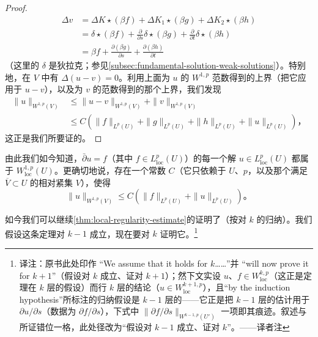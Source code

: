 \begin{proof}
\[
\begin{aligned}
\Delta v&=\Delta K\star(\beta f)+\Delta K_{1}\star(\beta g)+\Delta K_{2}\star(\beta h)\\
&=\delta\star(\beta f)+\frac{\partial}{\partial s}\delta\star(\beta g)+\frac{\partial}{\partial t}\delta\star(\beta h)\\
&=\beta f+\frac{\partial(\beta g)}{\partial s}+\frac{\partial(\beta h)}{\partial t}
\end{aligned}
\]
（这里的 $\delta$ 是狄拉克\trDistribution；参见\cref{subsec:fundamental-solution-weak-solutions}）。特别地，在 $V$ 中有 $\Delta(u-v)=0$。利用上面为 $u$ 的 $W^{1,p}$ 范数得到的上界（把它应用于 $u-v$），以及为 $v$ 的范数得到的那个上界，我们发现
\[
\begin{aligned}
\|u\|_{W^{1,p}(V)}&\le\|u-v\|_{W^{1,p}(V)}+\|v\|_{W^{1,p}(V)}\\
&\le C\left(\|f\|_{L^{p}(U)}+\|g\|_{L^{p}(U)}+\|h\|_{L^{p}(U)}+\|u\|_{L^{p}(U)}\right)\text{，}
\end{aligned}
\]
这正是我们所要证的。
\end{proof}

由此我们如今知道，$\bar{\partial}u=f$（其中 $f\in L^{p}_{\mathrm{loc}}(U)$）的每一个解 $u\in L^{p}_{\mathrm{loc}}(U)$ 都属于 $W^{1,p}_{\mathrm{loc}}(U)$。更确切地说，存在一个常数 $C$（它只依赖于 $U$、$p$，以及那个满足 $\overline{V}\subset U$ 的相对紧\trOpen{}集 $V$），使得
\[
\|u\|_{W^{1,p}(V)}\le C\left(\|f\|_{L^{p}(U)}+\|u\|_{L^{p}(U)}\right)\text{。}
\]

如今我们可以继续\cref{thm:local-regularity-estimate}的证明了（按对 $k$ 的归纳）。我们假设这条定理对 $k-1$ 成立，现在要对 $k$ 证明它。\footnote{译注：原书此处印作 “We assume that it holds for $k$……”并 “will now prove it for $k+1$”（假设对 $k$ 成立、证对 $k+1$）；然下文实设 $u$、$f\in W^{k,p}_{\mathrm{loc}}$（这正是定理在 $k$ 层的假设）而行 $k$ 层的结论（$u\in W^{k+1,p}_{\mathrm{loc}}$），且“by the induction hypothesis”所标注的归纳假设是 $k-1$ 层的——它正是把 $k-1$ 层的估计用于 $\partial u/\partial s$（数据为 $\partial f/\partial s$），下式中 $\|\partial f/\partial s\|_{W^{k-1,p}(U')}$ 一项即其痕迹。叙述与所证错位一格，此处径改为“假设对 $k-1$ 成立、证对 $k$”。——译者注}

